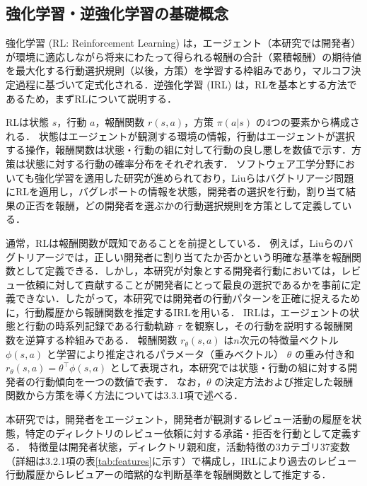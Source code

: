 \documentclass[submit,noauthor,ses,dvipdfmx]{ipsj}
\begin{document}

\vspace{-4mm}
\subsection{強化学習・逆強化学習の基礎概念}

強化学習 (RL: Reinforcement Learning) は，エージェント（本研究では開発者）が環境に適応しながら将来にわたって得られる報酬の合計（累積報酬）の期待値を最大化する行動選択規則（以後，方策）を学習する枠組みであり，マルコフ決定過程に基づいて定式化される．逆強化学習 (IRL) は，RLを基本とする方法であるため，まずRLについて説明する．

RLは状態 $s$，行動 $a$，報酬関数 $r(s, a)$，方策 $\pi(a|s)$ の4つの要素から構成される．
状態はエージェントが観測する環境の情報，行動はエージェントが選択する操作，報酬関数は状態・行動の組に対して行動の良し悪しを数値で示す．方策は状態に対する行動の確率分布をそれぞれ表す．
ソフトウェア工学分野においても強化学習を適用した研究が進められており，Liuらはバグトリアージ問題にRLを適用し，バグレポートの情報を状態，開発者の選択を行動，割り当て結果の正否を報酬，どの開発者を選ぶかの行動選択規則を方策として定義している\cite{RL}．

通常，RLは報酬関数が既知であることを前提としている．
例えば，Liuらのバグトリアージでは，正しい開発者に割り当てたか否かという明確な基準を報酬関数として定義できる．しかし，本研究が対象とする開発者行動においては，レビュー依頼に対して貢献することが開発者にとって最良の選択であるかを事前に定義できない．したがって，本研究では開発者の行動パターンを正確に捉えるために，行動履歴から報酬関数を推定するIRLを用いる．
IRLは，エージェントの状態と行動の時系列記録である行動軌跡 $\tau$ を観察し，その行動を説明する報酬関数を逆算する枠組みである．
報酬関数 $r_\theta(s,a)$ は$n$次元の特徴量ベクトル $\phi(s, a)$ と学習により推定されるパラメータ（重みベクトル） $\theta$ の重み付き和$r_\theta(s,a) = \theta^\top \phi(s,a)$ として表現され，本研究では状態・行動の組に対する開発者の行動傾向を一つの数値で表す．
なお，$\theta$ の決定方法および推定した報酬関数から方策を導く方法については3.3.1項で述べる．

本研究では，開発者をエージェント，開発者が観測するレビュー活動の履歴を状態，特定のディレクトリのレビュー依頼に対する承諾・拒否を行動として定義する．
特徴量は開発者状態，ディレクトリ親和度，活動特徴の3カテゴリ37変数（詳細は3.2.1項の表\ref{tab:features}に示す）で構成し，IRLにより過去のレビュー行動履歴からレビュアーの暗黙的な判断基準を報酬関数として推定する．
\end{document}

